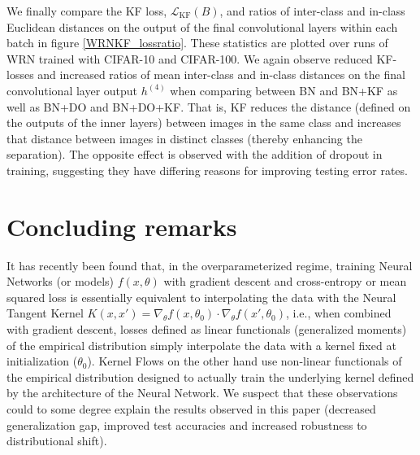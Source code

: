 \documentclass[11pt]{article}
\def\L{\mathcal{L}}
\begin{document}
We finally compare the KF loss, $\L_\text{KF}(B)$, and ratios of inter-class and in-class Euclidean distances on the output of the final convolutional layers within each batch in figure \ref{WRNKF_lossratio}.  These statistics are plotted over runs of WRN trained with CIFAR-10 and CIFAR-100.  We again observe reduced KF-losses and increased ratios of mean inter-class and in-class distances on the final convolutional layer output $h^{(4)}$ when comparing between BN and BN+KF as well as BN+DO and BN+DO+KF.  That is, KF reduces the distance (defined on the outputs of the inner layers) between images in the same class and increases that distance between images in distinct classes (thereby enhancing the separation).  The opposite effect is observed with the addition of dropout in training, suggesting they have differing reasons for improving testing error rates.


\begin{comment}
\section{Concluding remarks}

A framework for the application of kernel flows to Convolutional Neural Networks has been introduced which adds a generalizeability inspired loss function on hidden layer outputs.  This is optimized in tandem with the accuracy of the final output layer's accuracy.  We have presented a couple practical methods for its application to the MNIST database which has been shown to improve testing errors without decreasing training error as in dropout.  Further work could include research into richer kernel families possibly incorporating all hidden layer outputs.
\end{comment}


\section{Concluding remarks}
It has recently been found \cite{jacot2018neural, lee2019wide} that, in the overparameterized regime, training Neural Networks (or models) $f(x,\theta)$ with gradient descent and cross-entropy or mean squared loss is essentially equivalent to interpolating the data with the Neural Tangent Kernel $K(x,x')=\nabla_\theta f(x,\theta_0)\cdot \nabla_\theta f(x',\theta_0)$, i.e., when combined with gradient descent, losses defined as linear functionals (generalized moments) of the empirical distribution simply interpolate the data with a kernel fixed at initialization ($\theta_0$).
Kernel Flows on the other hand use non-linear functionals of the empirical distribution  designed to actually train the underlying kernel defined by the architecture of the Neural Network.
We suspect that these observations could to some degree explain the results observed in this paper (decreased generalization gap, improved test accuracies and increased robustness to distributional shift).
\end{document}
